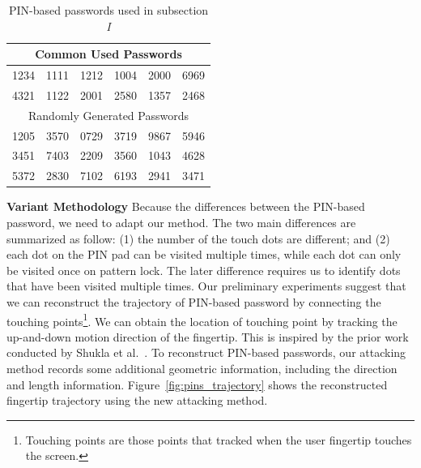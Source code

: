     \begin{table}[!t]
            \centering
            \caption{PIN-based passwords used in subsection \emph{I}}
            \label{tab:PIN-based passwords}
            \begin{tabular}{cccccc}
                \toprule
                \multicolumn{6}{c}{Common Used Passwords} \\
                \midrule
                1234 & 1111 & 1212 & 1004 & 2000 & 6969 \\
                \midrule
                4321 & 1122 & 2001 & 2580 & 1357 & 2468  \\
                \toprule
                \multicolumn{6}{c}{Randomly Generated Passwords} \\
                \midrule
                1205 & 3570 & 0729 & 3719 & 9867 & 5946  \\
                \midrule
                3451 & 7403 & 2209 & 3560 & 1043 & 4628  \\
                \midrule
                5372 & 2830 & 7102 & 6193 & 2941 & 3471  \\
                \bottomrule
            \end{tabular}
    \end{table}

        \noindent \textbf{Variant Methodology} Because the differences
        between the PIN-based password, we need to adapt our method. The two
        main differences are summarized as follow: (1) the number of the
        touch dots are different; and (2) each dot on the PIN pad can be
        visited multiple times, while each dot can only be visited once on
        pattern lock. The later difference requires us to identify dots that
        have been visited multiple times.  Our preliminary experiments
        suggest that we can reconstruct the trajectory of PIN-based password
        by connecting the touching points\footnote{Touching points are those
        points that tracked when the user fingertip touches the screen.}. We
        can obtain the location of touching point by tracking the up-and-down
        motion direction of the fingertip. This is inspired by the prior work
        conducted by Shukla {et al.}~\cite{shukla2014beware}. To reconstruct
        PIN-based passwords, our attacking method records some additional
        geometric information, including the direction and length
        information. Figure~\ref{fig:pins_trajectory} shows the reconstructed
        fingertip trajectory using the new attacking method.


